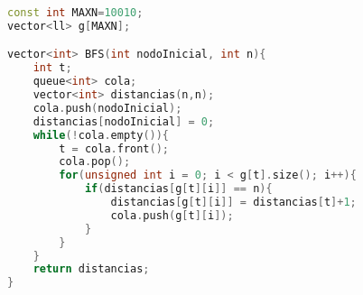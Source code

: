 \begin{lstlisting}[language=C++]
const int MAXN=10010;
vector<ll> g[MAXN];

vector<int> BFS(int nodoInicial, int n){
	int t;
	queue<int> cola;
	vector<int> distancias(n,n);
	cola.push(nodoInicial);
	distancias[nodoInicial] = 0;
	while(!cola.empty()){
		t = cola.front();
		cola.pop();
		for(unsigned int i = 0; i < g[t].size(); i++){
			if(distancias[g[t][i]] == n){
				distancias[g[t][i]] = distancias[t]+1;
				cola.push(g[t][i]);
			}
		}
	}
	return distancias;
}
\end{lstlisting}